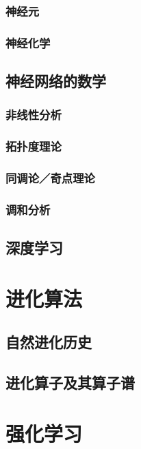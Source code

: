 \documentclass[12pt, a4paper]{report}
\newcommand{\cc}[2]{#1}
\newcommand{\cc}[2]{#2}
\theoremstyle{examples} \newtheorem{example}{Example}[section]
\begin{document}
		\subsection{\cc{神经元}{Neurons}}
		\subsection{\cc{神经化学}{Neuro-chemistry}}	
	
	\section{\cc{神经网络的数学}{Mathematics of neural networks}}

		\subsection{\cc{非线性分析}{Non-linear analysis}}
		\subsection{\cc{拓扑度理论}{Degree theory}}
		\subsection{\cc{同调论／奇点理论}{Homology}}
		\subsection{\cc{调和分析}{Harmonic analysis}}
	
	\section{\cc{深度学习}{Deep learning}}

\chapter{\cc{进化算法}{Evolution}}

	\section{\cc{自然进化历史}{History of natural evolution}}
	\section{\cc{进化算子及其算子谱}{Spectrum of the evolution operator}}

\chapter{\cc{强化学习}{Reinforcement learning}}
\end{document}
